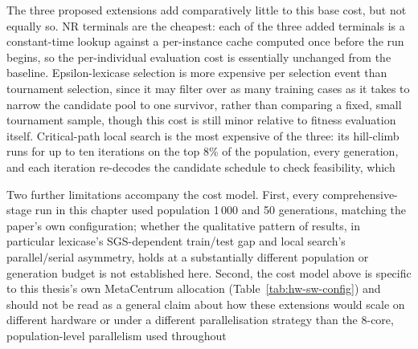 The three proposed extensions add comparatively little to this base cost,
but not equally so. NR terminals are the cheapest: each of the three added
terminals is a constant-time lookup against a per-instance cache computed
once before the run begins, so the per-individual evaluation cost is
essentially unchanged from the baseline. Epsilon-lexicase selection is
more expensive per selection event than tournament selection, since it may
filter over as many training cases as it takes to narrow the candidate
pool to one survivor, rather than comparing a fixed, small tournament
sample, though this cost is still minor relative to fitness evaluation
itself. Critical-path local search is the most expensive of the three: its
hill-climb runs for up to ten iterations on the top 8\% of the population,
every generation, and each iteration re-decodes the candidate schedule to
check feasibility, which 

Two further limitations accompany the cost
model. First, every comprehensive-stage run in this chapter used
population 1\,000 and 50 generations, matching the paper's own
configuration; whether the qualitative pattern of results, in particular
lexicase's SGS-dependent train/test gap and local search's parallel/serial
asymmetry, holds at a substantially different population or generation
budget is not established here. Second, the cost model above is
specific to this thesis's own MetaCentrum allocation
(Table~\ref{tab:hw-sw-config}) and
should not be read as a general claim about how these extensions would
scale on different hardware or under a different parallelisation strategy
than the 8-core, population-level parallelism used throughout
